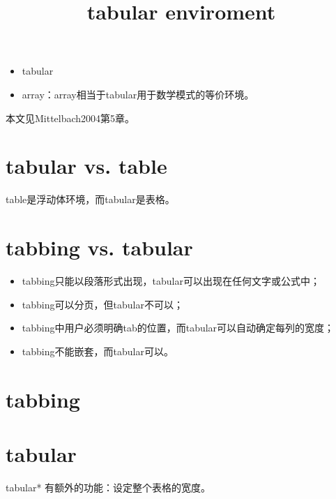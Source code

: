\documentclass{article}
\title{tabular enviroment}
\begin{document}
\maketitle
\begin{itemize}
\item tabular
\item array：array相当于tabular用于数学模式的等价环境。
\end{itemize}

本文见Mittelbach2004第5章。

\section{tabular vs. table}
table是浮动体环境，而tabular是表格。

\section{tabbing vs. tabular}
\begin{itemize}
\item tabbing只能以段落形式出现，tabular可以出现在任何文字或公式中；
\item tabbing可以分页，但tabular不可以；
\item tabbing中用户必须明确tab的位置，而tabular可以自动确定每列的宽度；
\item tabbing不能嵌套，而tabular可以。
\end{itemize}

\section{tabbing}

\section{tabular}

tabular* 有额外的功能：设定整个表格的宽度。
\end{document}
